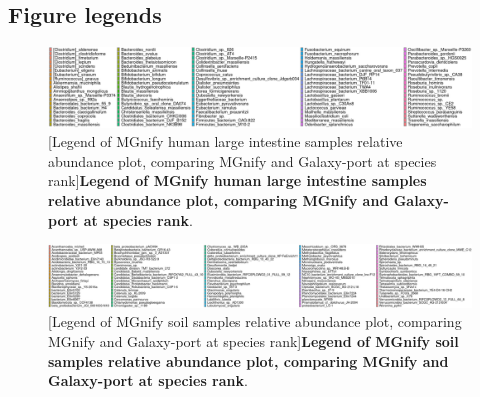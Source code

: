 \begin{landscape}
\subsection{Figure legends}\label{appendix_legends}
\vfill
\begin{figure}[H]
  \centering
  \includegraphics[width=1\linewidth, height=3\textheight, keepaspectratio]{figures/human_gut_abundance_level_s_mgnifyVSgalaxy_legend.png}
  [Legend of MGnify human large intestine samples relative abundance plot, comparing MGnify and Galaxy-port at species rank]{\textbf{Legend of MGnify human large intestine samples relative abundance plot, comparing MGnify and Galaxy-port at species rank}.} \label{fig:human_gut_abundance_level_s_mgnifyVSgalaxy_legend.png}%
\end{figure}
\vfill

\begin{figure}
  \includegraphics[width=1.1\linewidth, height=0.2\textheight]{figures/soil_abundace_level_s_mgnifyVSgalaxy_legend.png}
  [Legend of MGnify soil samples relative abundance plot, comparing MGnify and Galaxy-port at species rank]{\textbf{Legend of MGnify soil samples relative abundance plot, comparing MGnify and Galaxy-port at species rank}.} \label{fig:soil_abundace_level_s_mgnifyVSgalaxy_legend.png}%
\end{figure}
\end{landscape}


